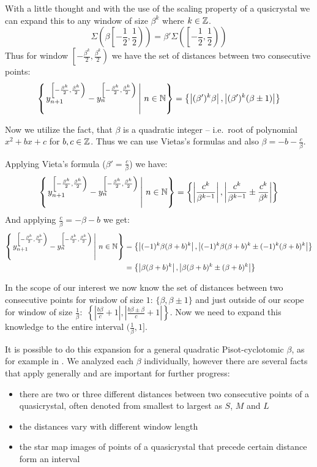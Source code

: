 \documentclass[text.tex]{subfiles}
\begin{document}
With a little thought and with the use of the scaling property of a qusicrystal we can expand this to any window of size $\beta^k$ where $k\in\mathbb{Z}$. 
$$\Sigma\left(\beta\left[-\frac{1}{2}, \frac{1}{2}\right)\right) = \beta'\Sigma\left(\left[-\frac{1}{2}, \frac{1}{2}\right)\right)$$%
Thus for window $\left[-\frac{\beta^k}{2}, \frac{\beta^k}{2}\right)$ we have the set of distances between two consecutive points:
$$\left\{\left. y^{\left[-\frac{\beta^k}{2}, \frac{\beta^k}{2}\right)}_{n+1}-y^{\left[-\frac{\beta^k}{2}, \frac{\beta^k}{2}\right)}_{n}\,\right|\, n\in\mathbb{N} \right\} =\left\{\left|(\beta')^k\beta\right|, \left|(\beta')^k(\beta \pm 1)\right|\right\}$$ %

Now we utilize the fact, that $\beta$ is a quadratic integer -- i.e.\ root of polynomial $x^2+bx+c$ for $b,c\in\mathbb{Z}$. Thus we can use Vietas's formulas and also $\beta = -b-\frac{c}{\beta}$. 

Applying Vieta's formula ($\beta' = \frac{c}{\beta}$) we have:
$$\left\{\left. y^{\left[-\frac{\beta^k}{2}, \frac{\beta^k}{2}\right)}_{n+1}-y^{\left[-\frac{\beta^k}{2}, \frac{\beta^k}{2}\right)}_{n}\,\right|\, n\in\mathbb{N} \right\} = \left\{\left|\frac{c^k}{\beta^{k-1}}\right|, \left|\frac{c^k}{\beta^{k-1}}\pm\frac{c^k}{\beta^{k}}\right|\right\}$$%
And applying $\frac{c}{\beta}=-\beta-b$ we get:
\begin{align*}
\left\{\left. y^{\left[-\frac{\beta^k}{2}, \frac{\beta^k}{2}\right)}_{n+1}-y^{\left[-\frac{\beta^k}{2}, \frac{\beta^k}{2}\right)}_{n}\,\right|\, n\in\mathbb{N} \right\} &= \left\{\left|(-1)^k\beta(\beta+b)^k\right|, \left|(-1)^k\beta(\beta+b)^k\pm(-1)^k(\beta+b)^k\right|\right\} \\
&= \left\{\left|\beta(\beta+b)^k\right|, \left|\beta(\beta+b)^k\pm(\beta+b)^k\right|\right\}
\end{align*}%

In the scope of our interest we now know the set of distances between two consecutive points for window of size $1$: $\{\beta, \beta \pm 1\}$ and just outside of our scope for window of size $\frac{1}{\beta}$:~$\left\{\left|\frac{b\beta}{c}+1\right|, \left|\frac{b\beta\pm\beta}{c} + 1\right|\right\}$. Now we need to expand this knowledge to the entire interval $(\frac{1}{\beta},1]$. %

It is possible to do this expansion for a general quadratic Pisot-cyclotomic $\beta$, as for example in \cite{distances}. We analyzed each $\beta$ individually, however there are several facts that apply generally and are important for further progress: 
\begin{itemize}
\item there are two or three different distances between two consecutive points of a quasicrystal, often denoted from smallest to largest as $S$, $M$ and $L$
\item the distances vary with different window length
\item the star map images of points of a quasicrystal that precede certain distance form an interval
\end{itemize}
\end{document}
